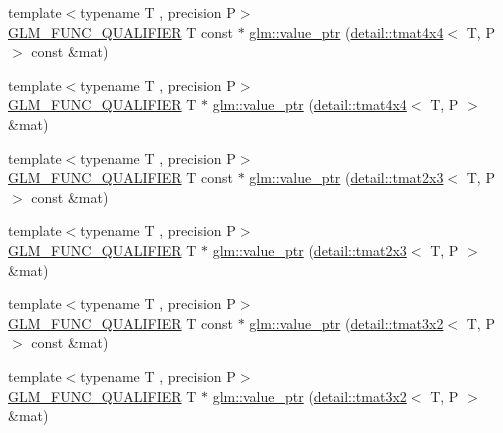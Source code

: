\begin{DoxyCompactItemize}
\item 
{\footnotesize template$<$typename T , precision P$>$ }\\\hyperlink{setup_8hpp_a33fdea6f91c5f834105f7415e2a64407}{G\+L\+M\+\_\+\+F\+U\+N\+C\+\_\+\+Q\+U\+A\+L\+I\+F\+I\+ER} T const  $\ast$ \hyperlink{group__gtc__type__ptr_gaa99522f78635f6949ebf82f065bafa94}{glm\+::value\+\_\+ptr} (\hyperlink{structglm_1_1detail_1_1tmat4x4}{detail\+::tmat4x4}$<$ T, P $>$ const \&mat)
\item 
{\footnotesize template$<$typename T , precision P$>$ }\\\hyperlink{setup_8hpp_a33fdea6f91c5f834105f7415e2a64407}{G\+L\+M\+\_\+\+F\+U\+N\+C\+\_\+\+Q\+U\+A\+L\+I\+F\+I\+ER} T $\ast$ \hyperlink{group__gtc__type__ptr_ga46c85fe444b7260c496be5fe0c146e87}{glm\+::value\+\_\+ptr} (\hyperlink{structglm_1_1detail_1_1tmat4x4}{detail\+::tmat4x4}$<$ T, P $>$ \&mat)
\item 
{\footnotesize template$<$typename T , precision P$>$ }\\\hyperlink{setup_8hpp_a33fdea6f91c5f834105f7415e2a64407}{G\+L\+M\+\_\+\+F\+U\+N\+C\+\_\+\+Q\+U\+A\+L\+I\+F\+I\+ER} T const  $\ast$ \hyperlink{group__gtc__type__ptr_gad5c4faad7a4553c875bc45656fcae73c}{glm\+::value\+\_\+ptr} (\hyperlink{structglm_1_1detail_1_1tmat2x3}{detail\+::tmat2x3}$<$ T, P $>$ const \&mat)
\item 
{\footnotesize template$<$typename T , precision P$>$ }\\\hyperlink{setup_8hpp_a33fdea6f91c5f834105f7415e2a64407}{G\+L\+M\+\_\+\+F\+U\+N\+C\+\_\+\+Q\+U\+A\+L\+I\+F\+I\+ER} T $\ast$ \hyperlink{group__gtc__type__ptr_gaaba8179ff5559d8b4493499313eb7a02}{glm\+::value\+\_\+ptr} (\hyperlink{structglm_1_1detail_1_1tmat2x3}{detail\+::tmat2x3}$<$ T, P $>$ \&mat)
\item 
{\footnotesize template$<$typename T , precision P$>$ }\\\hyperlink{setup_8hpp_a33fdea6f91c5f834105f7415e2a64407}{G\+L\+M\+\_\+\+F\+U\+N\+C\+\_\+\+Q\+U\+A\+L\+I\+F\+I\+ER} T const  $\ast$ \hyperlink{group__gtc__type__ptr_gaf8edbe29063a5b8221fc8afcb6af224d}{glm\+::value\+\_\+ptr} (\hyperlink{structglm_1_1detail_1_1tmat3x2}{detail\+::tmat3x2}$<$ T, P $>$ const \&mat)
\item 
{\footnotesize template$<$typename T , precision P$>$ }\\\hyperlink{setup_8hpp_a33fdea6f91c5f834105f7415e2a64407}{G\+L\+M\+\_\+\+F\+U\+N\+C\+\_\+\+Q\+U\+A\+L\+I\+F\+I\+ER} T $\ast$ \hyperlink{group__gtc__type__ptr_gae2e604002202417c7156db3deeb1301d}{glm\+::value\+\_\+ptr} (\hyperlink{structglm_1_1detail_1_1tmat3x2}{detail\+::tmat3x2}$<$ T, P $>$ \&mat)

\end{DoxyCompactItemize}
